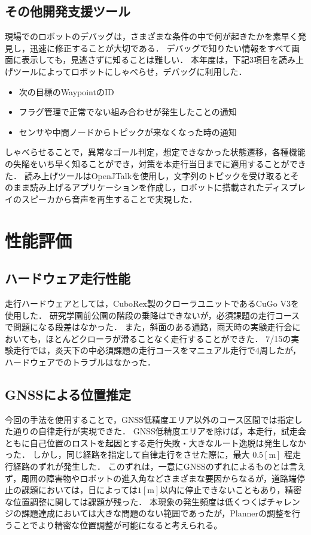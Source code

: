 \documentclass[platex,dvipdfmx]{rbproceedings}
\begin{document}
\subsection{その他開発支援ツール}
現場でのロボットのデバッグは，さまざまな条件の中で何が起きたかを素早く発見し，迅速に修正することが大切である．
デバッグで知りたい情報をすべて画面に表示しても，見逃さずに知ることは難しい．
本年度は，下記3項目を読み上げツールによってロボットにしゃべらせ，デバッグに利用した．
\begin{itemize}
    \item 次の目標のWaypointのID
    \item フラグ管理で正常でない組み合わせが発生したことの通知
    \item センサや中間ノードからトピックが来なくなった時の通知
\end{itemize}
しゃべらせることで，異常なゴール判定，想定できなかった状態遷移，各種機能の失陥をいち早く知ることができ，対策を本走行当日までに適用することができた．
読み上げツールはOpenJTalk\cite{openjtalk}を使用し，文字列のトピックを受け取るとそのまま読み上げるアプリケーションを作成し，ロボットに搭載されたディスプレイのスピーカから音声を再生することで実現した．

\section{性能評価}
\subsection{ハードウェア走行性能}
走行ハードウェアとしては，CuboRex製のクローラユニットであるCuGo V3を使用した．
研究学園前公園の階段の乗降はできないが，必須課題の走行コースで問題になる段差はなかった．
また，斜面のある通路，雨天時の実験走行会においても，ほとんどクローラが滑ることなく走行することができた．
7/15の実験走行では，炎天下の中必須課題の走行コースをマニュアル走行で4周したが，ハードウェアでのトラブルはなかった．

\subsection{GNSSによる位置推定} \label{ss:gnss_eval}
今回の手法を使用することで，GNSS低精度エリア以外のコース区間では指定した通りの自律走行が実現できた．
GNSS低精度エリアを除けば，本走行，試走会ともに自己位置のロストを起因とする走行失敗・大きなルート逸脱は発生しなかった．
しかし，同じ経路を指定して自律走行をさせた際に，最大 $0.5[\mathrm{m}]$ 程走行経路のずれが発生した．
このずれは，一意にGNSSのずれによるものとは言えず，周囲の障害物やロボットの進入角などさまざまな要因からなるが，道路端停止の課題においては，日によっては$1[ \mathrm{m}]$以内に停止できないこともあり，精密な位置調整に関しては課題が残った．
本現象の発生頻度は低くつくばチャレンジの課題達成においては大きな問題のない範囲であったが，Plannerの調整を行うことでより精密な位置調整が可能になると考えられる。
\end{document}
